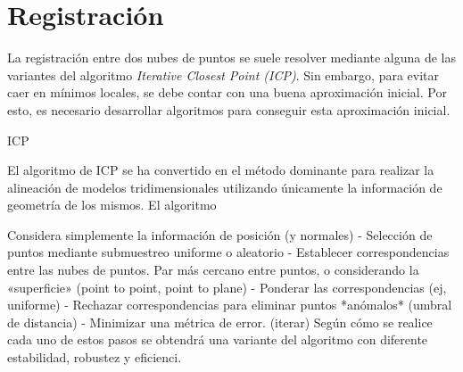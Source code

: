 

	\section{Registración}


		La registración entre dos nubes de puntos se suele resolver mediante
		alguna de las variantes del algoritmo \emph{Iterative Closest Point (ICP)}.
		Sin embargo, para evitar caer en mínimos locales,
		se debe contar con una buena aproximación inicial.
		Por esto, es necesario desarrollar algoritmos para conseguir esta
		aproximación inicial.\cite{7271006}

	ICP

	El algoritmo de ICP se ha convertido en el método dominante para realizar la alineación
	de modelos tridimensionales utilizando únicamente la información de geometría de los mismos.
	El algoritmo 


	Considera simplemente la información de posición (y normales)
	- Selección de puntos mediante submuestreo uniforme o aleatorio
	- Establecer correspondencias entre las nubes de puntos. Par más cercano entre puntos,
		o considerando la «superficie» (point to point, point to plane)
	- Ponderar las correspondencias (ej, uniforme)
	- Rechazar correspondencias para eliminar puntos *anómalos* (umbral de distancia)
	- Minimizar una métrica de error.  (iterar)
	Según cómo se realice cada uno de estos pasos se obtendrá una variante del algoritmo con
	diferente estabilidad, robustez y eficienci.




